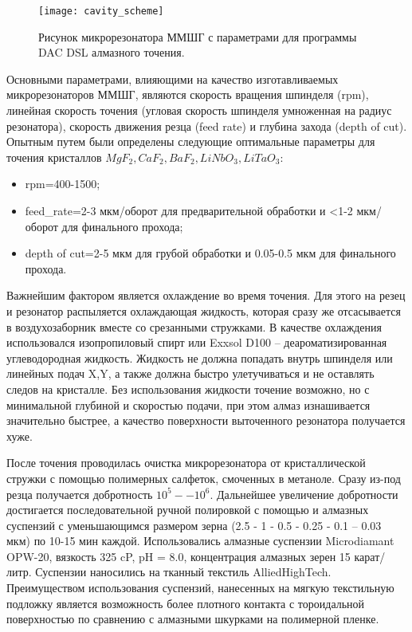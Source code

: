 \begin{figure}[ht]
  \texttt{[image: cavity\_scheme]}
  \caption{Рисунок микрорезонатора ММШГ с параметрами для программы DAC DSL алмазного точения.}
  \label{cavity_scheme}
\end{figure}

Основными параметрами, влияющими на качество изготавливаемых микрорезонаторов ММШГ, являются скорость вращения шпинделя (rpm), линейная скорость точения (угловая скорость шпинделя умноженная на радиус резонатора), скорость движения резца (feed rate) и глубина захода (depth of cut). Опытным путем были определены следующие оптимальные параметры для точения кристаллов $MgF_2, CaF_2, BaF_2, LiNbO_3, LiTaO_3$:

\begin{itemize}
    \item rpm=400-1500;
    \item feed_rate=2-3 мкм/оборот для предварительной обработки и <1-2 мкм/оборот для финального прохода;
    \item depth of cut=2-5 мкм для грубой обработки и 0.05-0.5 мкм для финального прохода.
\end{itemize}

Важнейшим фактором является охлаждение во время точения. Для этого на резец и резонатор распыляется охлаждающая жидкость, которая сразу же отсасывается в воздухозаборник вместе со срезанными стружками. В качестве охлаждения использовался изопропиловый спирт или Exxsol D100 – деароматизированная углеводородная жидкость. Жидкость не должна попадать внутрь шпинделя или линейных подач X,Y, а также должна быстро улетучиваться и не оставлять следов на кристалле. Без использования жидкости точение возможно, но с минимальной глубиной и скоростью подачи, при этом алмаз изнашивается значительно быстрее, а качество поверхности выточенного резонатора получается хуже.

После точения проводилась очистка микрорезонатора от кристаллической стружки с помощью полимерных салфеток, смоченных в метаноле. Сразу из-под резца получается добротность $10^5 -- 10^6$. Дальнейшее увеличение добротности достигается последовательной ручной полировкой с помощью и алмазных суспензий с уменьшающимся размером зерна (2.5 - 1 - 0.5 - 0.25 - 0.1 – 0.03 мкм) по 10-15 мин каждой. Использовались алмазные суспензии Microdiamant OPW-20, вязкость 325 cP, pH = 8.0, концентрация алмазных зерен 15 карат/литр. Суспензии наносились на тканный текстиль AlliedHighTech. Преимуществом использования суспензий, нанесенных на мягкую текстильную подложку является возможность более плотного контакта с тороидальной поверхностью по сравнению с алмазными шкурками на полимерной пленке.

